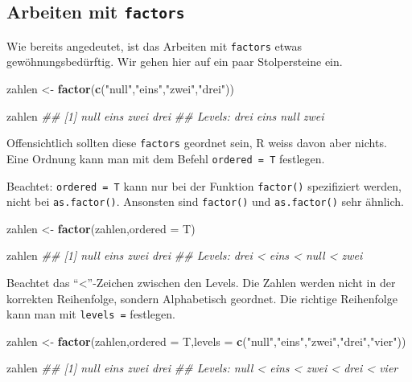\documentclass[]{book}
\newenvironment{Shaded}{\begin{snugshade}}{\end{snugshade}}
\newcommand{\CommentTok}[1]{\textcolor[rgb]{0.56,0.35,0.01}{\textit{#1}}}
\newcommand{\DataTypeTok}[1]{\textcolor[rgb]{0.13,0.29,0.53}{#1}}
\newcommand{\KeywordTok}[1]{\textcolor[rgb]{0.13,0.29,0.53}{\textbf{#1}}}
\newcommand{\NormalTok}[1]{#1}
\newcommand{\StringTok}[1]{\textcolor[rgb]{0.31,0.60,0.02}{#1}}
\begin{document}
\hypertarget{arbeiten-mit-factors}{%
\subsection{\texorpdfstring{Arbeiten mit \texttt{factors}}{Arbeiten mit factors}}\label{arbeiten-mit-factors}}

Wie bereits angedeutet, ist das Arbeiten mit \texttt{factors} etwas gewöhnungsbedürftig. Wir gehen hier auf ein paar Stolpersteine ein.

\begin{Shaded}
\begin{Highlighting}[]
\NormalTok{zahlen <-}\StringTok{ }\KeywordTok{factor}\NormalTok{(}\KeywordTok{c}\NormalTok{(}\StringTok{"null"}\NormalTok{,}\StringTok{"eins"}\NormalTok{,}\StringTok{"zwei"}\NormalTok{,}\StringTok{"drei"}\NormalTok{))}

\NormalTok{zahlen}
\CommentTok{## [1] null eins zwei drei}
\CommentTok{## Levels: drei eins null zwei}
\end{Highlighting}
\end{Shaded}

Offensichtlich sollten diese \texttt{factors} geordnet sein, R weiss davon aber nichts. Eine Ordnung kann man mit dem Befehl \texttt{ordered\ =\ T} festlegen.

Beachtet: \texttt{ordered\ =\ T} kann nur bei der Funktion \texttt{factor()} spezifiziert werden, nicht bei \texttt{as.factor()}. Ansonsten sind \texttt{factor()} und \texttt{as.factor()} sehr ähnlich.

\begin{Shaded}
\begin{Highlighting}[]
\NormalTok{zahlen <-}\StringTok{ }\KeywordTok{factor}\NormalTok{(zahlen,}\DataTypeTok{ordered =}\NormalTok{ T)}

\NormalTok{zahlen}
\CommentTok{## [1] null eins zwei drei}
\CommentTok{## Levels: drei < eins < null < zwei}
\end{Highlighting}
\end{Shaded}

Beachtet das ``\textless{}''-Zeichen zwischen den Levels. Die Zahlen werden nicht in der korrekten Reihenfolge, sondern Alphabetisch geordnet. Die richtige Reihenfolge kann man mit \texttt{levels\ =} festlegen.

\begin{Shaded}
\begin{Highlighting}[]
\NormalTok{zahlen <-}\StringTok{ }\KeywordTok{factor}\NormalTok{(zahlen,}\DataTypeTok{ordered =}\NormalTok{ T,}\DataTypeTok{levels =} \KeywordTok{c}\NormalTok{(}\StringTok{"null"}\NormalTok{,}\StringTok{"eins"}\NormalTok{,}\StringTok{"zwei"}\NormalTok{,}\StringTok{"drei"}\NormalTok{,}\StringTok{"vier"}\NormalTok{))}

\NormalTok{zahlen}
\CommentTok{## [1] null eins zwei drei}
\CommentTok{## Levels: null < eins < zwei < drei < vier}
\end{Highlighting}
\end{Shaded}
\end{document}
